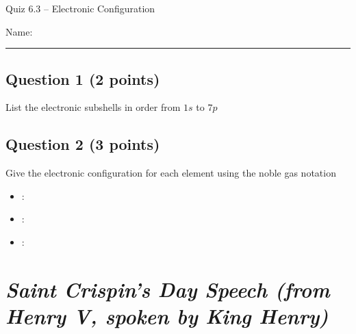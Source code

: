 \documentclass[11pt, letterpaper]{memoir}
\begin{document}
	\begin{center}
		{\large	Quiz 6.3 -- Electronic Configuration}
	\end{center}
{\large Name: \rule[-1mm]{4in}{.1pt}
	
	\subsection*{Question 1 (2 points)}
	List the electronic subshells in order from $1s$ to $7p$
	
	\vspace{10em}
	\subsection*{Question 2 (3 points)}
	Give the electronic configuration for each element using the noble gas notation
	
	\begin{itemize}
		\item {}:
		\item \vspace{4em} :
		\item \vspace{4em} :
	\end{itemize}


	
\newpage
\pagestyle{empty}
\addtocounter{page}{-1}
\section*{\emph{Saint Crispin's Day Speech (from \emph{Henry V}, spoken by King Henry)}}
}
\end{document}

